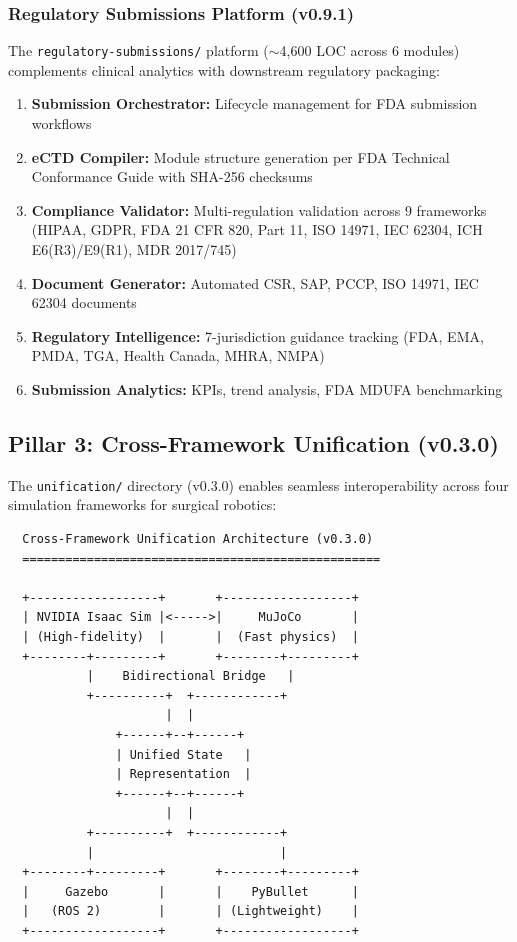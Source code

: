 \subsubsection{Regulatory Submissions Platform (v0.9.1)}

The \texttt{regulatory-submissions/} platform ($\sim$4,600 LOC across 6 modules) complements clinical analytics with downstream regulatory packaging:

\begin{enumerate}
  \item \textbf{Submission Orchestrator:} Lifecycle management for FDA submission workflows
  \item \textbf{eCTD Compiler:} Module structure generation per FDA Technical Conformance Guide with SHA-256 checksums
  \item \textbf{Compliance Validator:} Multi-regulation validation across 9 frameworks (HIPAA, GDPR, FDA 21 CFR 820, Part 11, ISO 14971, IEC 62304, ICH E6(R3)/E9(R1), MDR 2017/745)
  \item \textbf{Document Generator:} Automated CSR, SAP, PCCP, ISO 14971, IEC 62304 documents
  \item \textbf{Regulatory Intelligence:} 7-jurisdiction guidance tracking (FDA, EMA, PMDA, TGA, Health Canada, MHRA, NMPA)
  \item \textbf{Submission Analytics:} KPIs, trend analysis, FDA MDUFA benchmarking
\end{enumerate}

\subsection{Pillar 3: Cross-Framework Unification (v0.3.0)}
\label{sec:unification}

The \texttt{unification/} directory (v0.3.0) enables seamless interoperability across four simulation frameworks for surgical robotics:

\begin{verbatim}
  Cross-Framework Unification Architecture (v0.3.0)
  ==================================================

  +------------------+       +------------------+
  | NVIDIA Isaac Sim |<----->|     MuJoCo       |
  | (High-fidelity)  |       |  (Fast physics)  |
  +--------+---------+       +--------+---------+
           |    Bidirectional Bridge   |
           +----------+  +------------+
                      |  |
               +------+--+------+
               | Unified State   |
               | Representation  |
               +------+--+------+
                      |  |
           +----------+  +------------+
           |                          |
  +--------+---------+       +--------+---------+
  |     Gazebo       |       |    PyBullet      |
  |   (ROS 2)        |       | (Lightweight)    |
  +------------------+       +------------------+
\end{verbatim}

